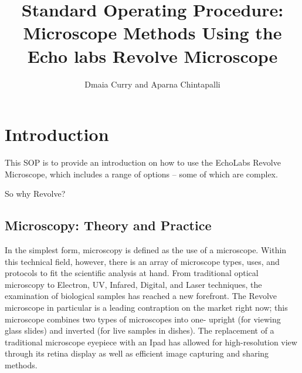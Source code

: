 \documentclass{article}
\title{Standard Operating Procedure: Microscope Methods Using the Echo labs Revolve Microscope}
\author{Dmaia Curry and Aparna Chintapalli}
\begin{document}


\maketitle

\section{Introduction}


This SOP is to provide an introduction on how to use the EchoLabs Revolve Microscope, which includes a range of options -- some of which are complex.

So why Revolve?

\subsection{Microscopy: Theory and Practice}

In the simplest form, microscopy is defined as the use of a microscope. Within this technical field, however, there is an array of microscope types, uses, and protocols to fit the scientific analysis at hand. From traditional optical microscopy to Electron, UV, Infared, Digital, and Laser techniques, the examination of biological samples has reached a new forefront. The Revolve microscope in particular is a leading contraption on the market right now; this microscope combines two types of microscopes into one- upright (for viewing glass slides) and inverted (for live samples in dishes). The replacement of a traditional microscope eyepiece with an Ipad has allowed for high-resolution view through its retina display as well as efficient image capturing and sharing methods.
\end{document}
